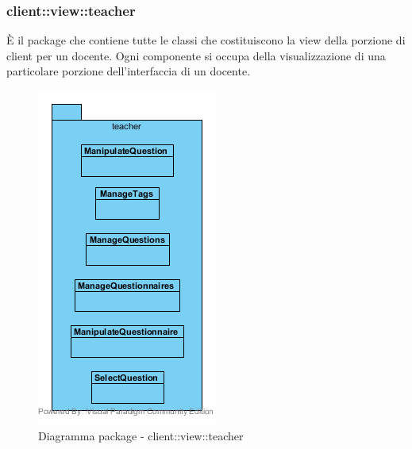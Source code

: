 \subsubsection{client::view::teacher}
È il package che contiene tutte le classi che costituiscono la view della porzione di client per un docente. Ogni componente si occupa della visualizzazione di una particolare porzione dell'interfaccia di un docente.\begin{center}
	\begin{figure}[H]
		\centering \includegraphics[scale=4, max width=\textwidth, max height=\myheight]{../img/diagrammiClassi/client/view/teacher.png}
		\caption{Diagramma package - client::view::teacher}
	\end{figure}
\end{center}\hypertarget{client::view::teacher::ManipulateQuestion}{}
